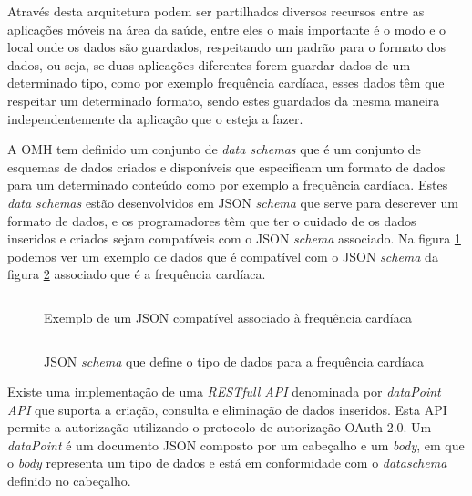 Através desta arquitetura podem ser partilhados diversos recursos entre as aplicações móveis na área da saúde, entre eles o mais importante é o modo e o local onde os dados são guardados, respeitando um padrão para o formato dos dados, ou seja, se duas aplicações diferentes forem guardar dados de um determinado tipo, como por exemplo frequência cardíaca, esses dados têm que respeitar um determinado formato, sendo estes guardados da mesma maneira independentemente da aplicação que o esteja a fazer.
\par 
A \gls{OMH} tem definido um conjunto de \textit{data schemas} que é um conjunto de esquemas de dados criados e disponíveis que especificam um formato de dados para um determinado conteúdo como por exemplo a frequência cardíaca\cite{omhschemas}. Estes \textit{data schemas} estão desenvolvidos em \gls{JSON} \textit{schema} que serve para descrever um formato de dados, e os programadores têm que ter o cuidado de os dados inseridos e criados sejam  compatíveis com o \gls{JSON} \textit{schema} associado. Na figura \ref{f:exemplo} podemos ver um exemplo de dados que é compatível com o \gls{JSON} \textit{schema} da figura \ref{f:hrjsonschema} associado que é a frequência cardíaca\cite{omhheartrate}.

\begin{figure}[H]
\inputminted[fontsize=\scriptsize]{json}{code/heart-rate.json}
\caption[Exemplo de um \gls{JSON} compatível associado à frequência cardíaca]{Exemplo de um \gls{JSON} compatível associado à frequência cardíaca \cite{omhheartrate}}
\label{f:exemplo}
\end{figure}
\newpage
\begin{figure}[H]
\inputminted[fontsize=\scriptsize]{json}{code/hr-jsonschema.json}
\caption[\gls{JSON} \textit{schema} que define o tipo de dados para a frequência cardíaca]{\gls{JSON} \textit{schema} que define o tipo de dados para a frequência cardíaca \cite{omhheartrate}}
\label{f:hrjsonschema}
\end{figure}

Existe uma implementação de uma \textit{\gls{REST}full \gls{API}} denominada por \textit{dataPoint API} que suporta a criação, consulta e eliminação de dados inseridos. Esta \gls{API} permite a autorização utilizando o protocolo de autorização OAuth 2.0. Um \textit{dataPoint} é um documento \gls{JSON} composto por um cabeçalho e um \textit{body}, em que o \textit{body} representa um tipo de dados e está em conformidade com o \textit{dataschema} definido no cabeçalho.



